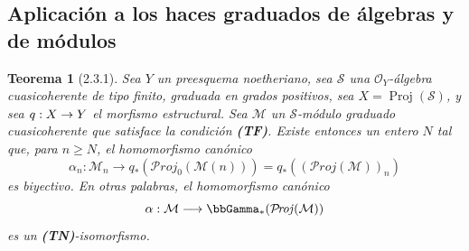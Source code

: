 \documentclass[10pt,oneside,openany]{book}
\theoremstyle{egaenv}\newtheorem*{env}{---}
\theoremstyle{egastatement}
\newtheorem*{theorem}{Teorema}
\theoremstyle{egadescription}
\newcommand{\oldpage}[2][]{\marginnote{\normalfont\scriptsize\textbf{#1}\,|\,#2}\ignorespaces}
\providecommand{\shProj}{\mathcal{P}\!\mathit{roj}}
\renewcommand{\geq}{\geqslant}
\renewcommand{\to}{\mathchoice{\longrightarrow}{\rightarrow}{\rightarrow}{\rightarrow}}
\begin{document}
\subsection{Aplicación a los haces graduados de álgebras y de módulos}
\label{subsection:III.2.3}
\label{subsection:III.2.3-fr}

\begin{theorem}[2.3.1]
\label{III.2.3.1}
\label{III.2.3.1-fr}
Sea $Y$ un preesquema noetheriano, sea $\mathcal S$ una $\mathcal O_Y$-álgebra cuasicoherente de tipo finito, graduada en grados positivos, sea
$X=\operatorname{Proj}(\mathcal S)$,
y sea $q:X\to Y$ el morfismo estructural.
Sea $\mathcal M$ un $\mathcal S$-módulo graduado cuasicoherente que satisface la condición \textup{\textbf{(TF)}}.
Existe entonces un entero $N$ tal que, para $n\geq N$, el homomorfismo canónico \textup{}
\[
\alpha_n:\mathcal M_n\longrightarrow
q_*(\shProj_0(\mathcal M(n)))
=q_*((\shProj(\mathcal M))_n)
\]
\oldpage[III]{103}
es biyectivo.
En otras palabras, el homomorfismo canónico
\[
\alpha:\mathcal M\longrightarrow\bbGamma_*(\shProj(\mathcal M))
\]
es un \textup{\textbf{(TN)}}-isomorfismo.
\end{theorem}
\end{document}
